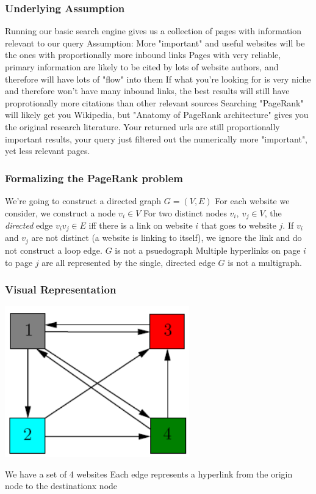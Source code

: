 \documentclass{beamer}
\begin{document}
\begin{frame}[t]
\frametitle{Underlying Assumption}    
\begin{outline}
    \1 Running our basic search engine gives us a collection of pages with information relevant to our query
    \1 Assumption: More "important" and useful websites will be the ones with proportionally more inbound links
    \1 Pages with very reliable, primary information are likely to be cited by lots of website authors, and therefore will have lots of "flow" into them
    \1 If what you're looking for is very niche and therefore won't have many inbound links, the best results will still have proprotionally more citations than other relevant sources
    \1 Searching "PageRank" will likely get you Wikipedia, but "Anatomy of PageRank architecture" gives you the original research literature. Your returned urls are still proportionally important results, your query just filtered out the numerically more "important", yet less relevant pages.
\end{outline}
\end{frame}

\begin{frame}[t]
\frametitle{Formalizing the PageRank problem}
\begin{outline}
    \1 We're going to construct a directed graph $G = (V, E)$
    \1 For each website we consider, we construct a node $v_i \in V$
    \1 For two distinct nodes $v_i,\ v_j \in V$, the \emph{directed} edge $v_iv_j \in E$ iff there is a link on website $i$ that goes to website $j$.
    \1 If $v_i$ and $v_j$ are not distinct (a website is linking to itself), we ignore the link and do not construct a loop edge.
        \2 $G$ is not a psuedograph
    \1 Multiple hyperlinks on page $i$ to page $j$ are all represented by the single, directed edge 
        \2 $G$ is not a multigraph.
\end{outline}
\end{frame}

\begin{frame}
\frametitle{Visual Representation}
\begin{center}
    \includegraphics[width=0.6\textwidth]{unweighted.png}
\end{center}
\begin{outline}
    \1 We have a set of 4 websites
    \1 Each edge represents a hyperlink from the origin node to the destinationx node 
\end{outline}
\end{frame}
\end{document}
